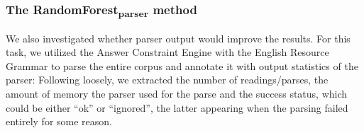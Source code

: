 \documentclass[a4paper,10pt]{scrartcl}
\theoremstyle{style}
\begin{document}













\subsubsection{The RandomForest\textsubscript{parser} method}
We also investigated whether parser output would improve the results. For this task, we utilized the Answer Constraint Engine \citep{ace} with the English Resource Grammar \citep{copestake2002implementing} to parse the entire corpus and annotate it with output statistics of the parser: Following \cite{wagner2007comparative} loosely, we extracted the number of readings/parses, the amount of memory the parser used for the parse and the success status, which could be either ``ok'' or ``ignored'', the latter appearing when the parsing failed entirely for some reason.
\end{document}
